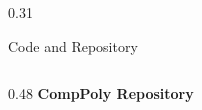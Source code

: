 \documentclass[final]{beamer}
\newenvironment{posterblock}[1]{%
  \begin{block}{#1}
  \vspace{0.35em}
}{%
  \vspace{0.25em}
  \end{block}
}
\begin{document}
\begin{frame}[fragile,t]
\begin{columns}[T,totalwidth=0.96\paperwidth]
\begin{column}{0.31\paperwidth}
\begin{posterblock}{Code and Repository}
\begin{columns}[T,totalwidth=\linewidth]
\begin{column}{0.48\linewidth}
    \vspace{0.22cm}
    \textbf{CompPoly Repository}
  \end{column}
\end{columns}
\end{posterblock}

\end{column}

\end{columns}

\end{frame}
\end{document}
